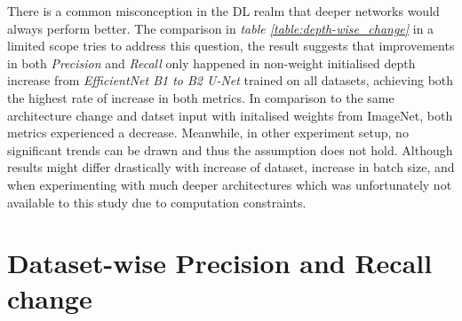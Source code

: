 \documentclass[11pt, a4paper, twoside]{report}
\begin{document}
There is a common misconception in the DL realm that deeper networks would always perform better. The comparison in \textit{table \ref{table:depth-wise_change}} in a limited scope tries to address this question, the result suggests that improvements in both \textit{Precision} and \textit{Recall} only happened in non-weight initialised depth increase from \textit{EfficientNet B1 to B2 U-Net} trained on all datasets, achieving both the highest rate of increase in both metrics. In comparison to the same architecture change and datset input with initalised weights from ImageNet, both metrics experienced a decrease. Meanwhile, in other experiment setup, no significant trends can be drawn and thus the assumption does not hold. Although results might differ drastically with increase of dataset, increase in batch size, and when experimenting with much deeper architectures which was unfortunately not available to this study due to computation constraints.\\\par

\section{Dataset-wise Precision and Recall change}\label{data_change}

\begin{table}[H]
  \centering
  \label{table:data-wise_change}
  \caption{Changes when the Dzaleka and Dzaleka North datasets were introduced to each setup.}
\end{table}
\end{document}
